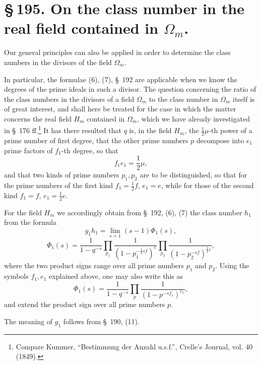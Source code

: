 \documentclass[11pt]{article}
\begin{document}
\clearpage
\section*{\S\,195. On the class number in the real field contained in $\Omega_m$.}

Our general principles can also be applied in order to determine the class numbers in the divisors of the field $\Omega_m$.

In particular, the formulae (6), (7), \S~192 are applicable when we know the degrees of the prime ideals in such a divisor. The question concerning the ratio of the class numbers in the divisors of a field $\Omega_m$ to the class number in $\Omega_m$ itself is of great interest, and shall here be treated for the case in which the matter concerns the real field $H_m$ contained in $\Omega_m$, which we have already investigated in \S~176 ff.\footnote{Compare Kummer, ``Bestimmung der Anzahl u.s.f.'', Crelle's Journal, vol. 40 (1849).} It has there resulted that $q$ is, in the field $H_m$, the $\frac12\mu$-th power of a prime number of first degree, that the other prime numbers $p$ decompose into $e_1$ prime factors of $f_1$-th degree, so that
\begin{equation}
f_1e_1=\frac12\mu,
\tag{1}
\end{equation}
and that two kinds of prime numbers $p_1,p_2$ are to be distinguished, so that for the prime numbers of the first kind $f_1=\frac12 f$, $e_1=e$, while for those of the second kind $f_1=f$, $e_1=\frac12 e$.

For the field $H_m$ we accordingly obtain from \S~192, (6), (7) the class number $h_1$ from the formula
\begin{equation}
g_1h_1=\lim_{s=1}(s-1)\Phi_1(s),
\tag{2}
\end{equation}
\begin{equation}
\Phi_1(s)=\frac1{1-q^{-s}}\prod_{p_1}\frac1{(1-p_1^{-\frac12sf})^e}\prod_{p_2}\frac1{(1-p_2^{-sf})^{\frac12e}},
\tag{3}
\end{equation}
where the two product signs range over all prime numbers $p_1$ and $p_2$. Using the symbols $f_1,e_1$ explained above, one may also write this as
\begin{equation}
\Phi_1(s)=\frac1{1-q^{-s}}\prod_p\frac1{(1-p^{-sf_1})^{e_1}},
\tag{4}
\end{equation}
and extend the product sign over all prime numbers $p$.

The meaning of $g_1$ follows from \S~190, (11).
\end{document}
